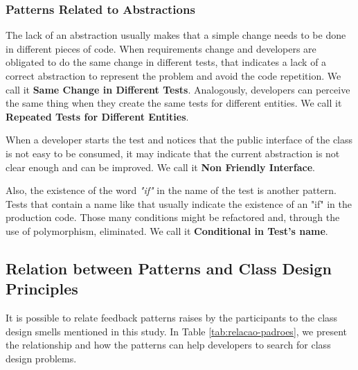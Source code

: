 \documentclass[times]{speauth}
\begin{document}
\subsubsection{Patterns Related to Abstractions}

The lack of an abstraction usually makes that a simple change needs to
be done in different pieces of code. When requirements change and
developers are obligated to do the same change in different tests,
that indicates a lack of a correct abstraction to represent the problem
and avoid the code repetition. We call it \textbf{Same Change in Different Tests}.
Analogously, developers can perceive the same thing when they create the
same tests for different entities. We call it \textbf{Repeated Tests for Different Entities}.

When a developer starts the test and notices that the public interface of the class
is not easy to be consumed, it may indicate that the current abstraction is not
clear enough and can be improved. We call it \textbf{Non Friendly Interface}.

Also, the existence of the word \textit{"if"} in the name of the test is another
pattern. Tests that contain a name like that usually indicate the existence
of an "if" in the production code. Those many conditions might be refactored and,
through the use of polymorphism, eliminated. We call it \textbf{Conditional in Test's name}.

\subsection{Relation between Patterns and Class Design Principles}

It is possible to relate feedback patterns raises by the participants to the class design
smells mentioned in this study.
In Table \ref{tab:relacao-padroes}, we present the relationship and how the patterns
can help developers to search for class design problems.
\end{document}
